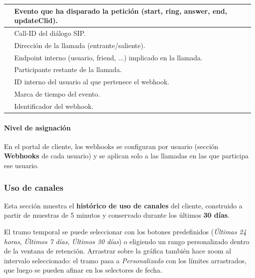 \documentclass[letterpaper,10pt,spanish]{sphinxmanual}
\begin{document}
\noindent\begin{tabulary}{\linewidth}{|L|L|}
\hline

&
Evento que ha disparado la petición (start, ring, answer, end, updateClid).
\\
\hline
{}
&
Call-ID del diálogo SIP.
\\
\hline
{}
&
Dirección de la llamada (entrante/saliente).
\\
\hline
{}
&
Endpoint interno (usuario, friend, ...) implicado en la llamada.
\\
\hline
{}
&
Participante restante de la llamada.
\\
\hline
{}
&
ID interno del usuario al que pertenece el webhook.
\\
\hline
{}
&
Marca de tiempo del evento.
\\
\hline
{}
&
Identificador del webhook.
\\
\hline\end{tabulary}



\paragraph{Nivel de asignación}
\label{administration_portal/client/vpbx/calls/webhooks:assignment-level}
En el portal de cliente, los webhooks se configuran por usuario (sección \textbf{Webhooks} de cada usuario) y se aplican solo a las llamadas en las que participa ese usuario.


\subsubsection{Uso de canales}
\label{administration_portal/client/vpbx/calls/channel_usage:channel-usage}\label{administration_portal/client/vpbx/calls/channel_usage::doc}
Esta sección muestra el \textbf{histórico de uso de canales} del cliente, construido a partir de muestras de 5 minutos y conservado durante los últimos \textbf{30 días}.

El tramo temporal se puede seleccionar con los botones predefinidos (\emph{Últimas 24 horas}, \emph{Últimos 7 días}, \emph{Últimos 30 días}) o eligiendo un rango personalizado dentro de la ventana de retención. Arrastrar sobre la gráfica también hace zoom al intervalo seleccionado: el tramo pasa a \emph{Personalizado} con los límites arrastrados, que luego se pueden afinar en los selectores de fecha.
\end{document}
